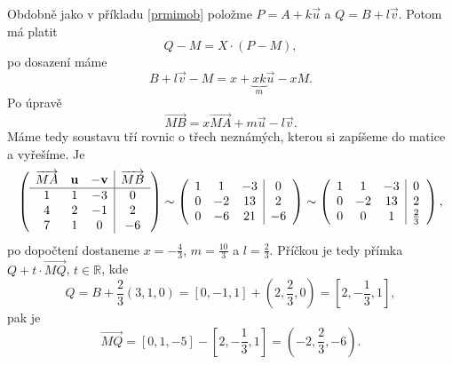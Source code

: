 \begin{reseni}
Obdobně jako v příkladu \ref{prmimob} položme $P=A+k\vec u$ a $Q = B+l\vec v$. Potom má platit
$$
Q-M = X\cdot \left( P-M \right ) ,
$$
 po dosazení máme
 $$
    B + l\vec v - M = x + \underbrace{xk}_{m} \vec u - xM.
 $$
Po úpravě
$$
    \overrightarrow{MB} = x \overrightarrow{MA} + m \vec u - l\vec v.
$$
Máme tedy soustavu tří rovnic o třech neznámých, kterou si zapíšeme do matice a vyřešíme. Je
$$
\left (
\begin{array}{c c c | c }
\overrightarrow{MA} & \vec u & -\vec v & \overrightarrow{MB}\\
\hline
1 & 1 & -3 & 0 \\
4 & 2 & -1 & 2 \\
7 & 1 & 0 & -6
\end{array}
\right ) \sim \left (
\begin{array}{c c c | c }
1 & 1 & -3 & 0 \\
0 & -2 & 13 & 2 \\
0 & -6 & 21 & -6
\end{array}
\right ) \sim \left (
\begin{array}{c c c | c }
1 & 1 & -3 & 0 \\
0 & -2 & 13 & 2 \\
0 & 0 & 1 & \frac{2}{3}
\end{array}
\right ) ,
$$
po dopočtení dostaneme $x = -\frac{4}{3}$, $m = \frac{10}{3}$ a $l = \frac{2}{3}$. Příčkou je tedy přímka
$Q + t \cdot \overrightarrow{MQ}$, $t \in \mathbb R $, kde
$$Q = B + \frac{2}{3} (3,1,0) = [0,-1,1] + \left( 2, \frac{2}{3}, 0 \right ) =\left [2,-\frac{1}{3}, 1\right], $$
pak je
$$
    \overrightarrow{MQ} = [0,1,-5] - \left [2,-\frac{1}{3}, 1\right] = \left( -2, \frac{2}{3}, -6 \right ).
$$
\end{reseni}
